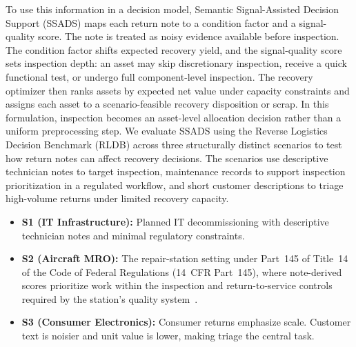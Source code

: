\documentclass[a4paper,conference]{IEEEtran}
\begin{document}
To use this information in a decision model, Semantic Signal-Assisted Decision
Support (SSADS) maps each return note to a condition factor and a signal-quality score.
The note is treated as noisy evidence
available before inspection. The condition factor shifts expected recovery yield,
and the signal-quality score sets inspection depth:
an asset may skip discretionary inspection, receive a quick functional test, or undergo full
component-level inspection. The recovery optimizer then ranks assets by expected net
value under capacity constraints and assigns each asset to a scenario-feasible
recovery disposition or scrap. In this formulation, inspection becomes an asset-level allocation
decision rather than a uniform preprocessing step. We evaluate SSADS using the
Reverse Logistics Decision Benchmark (RLDB) across
three structurally distinct scenarios to test how return notes can affect recovery
decisions. The scenarios use descriptive technician notes to target inspection,
maintenance records to support inspection prioritization in a regulated workflow,
and short customer descriptions to triage high-volume returns under limited
recovery capacity.

\begin{itemize}[leftmargin=*,noitemsep]
\item \textbf{S1 (IT Infrastructure):} Planned IT decommissioning with descriptive
  technician notes and minimal regulatory constraints.

\item \textbf{S2 (Aircraft MRO):} The repair-station setting under Part~145 of
  Title~14 of the Code of Federal Regulations (14~CFR Part~145), where
  note-derived scores prioritize work within the inspection and return-to-service
  controls required by the station's quality
  system~\cite{eCFRPart145}.

\item \textbf{S3 (Consumer Electronics):} Consumer returns emphasize scale.
  Customer text is noisier and unit value is lower, making triage the central task.
\end{itemize}
\end{document}
